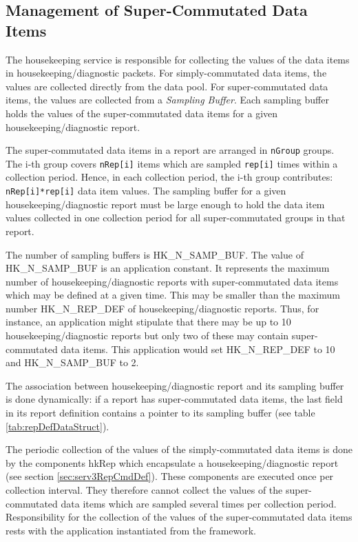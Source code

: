 \documentclass{pnp_article}
\begin{document}
\subsection{Management of Super-Commutated Data Items}\label{sec:serv3SupCommDataItems}
The housekeeping service is responsible for collecting the values of the data items in housekeeping/diagnostic packets. For simply-commutated data items, the values are collected directly from the data pool. For super-commutated data items, the values are collected from a \textit{Sampling Buffer}. Each sampling buffer holds the values of the super-commutated data items for a given housekeeping/diagnostic report.

The super-commutated data items in a report are arranged in \texttt{nGroup} groups. The i-th group covers \texttt{nRep[i]} items which are sampled \texttt{rep[i]} times within a collection period. Hence, in each collection period, the i-th group contributes: \texttt{nRep[i]*rep[i]} data item values. The sampling buffer for a given housekeeping/diagnostic report must be large enough to hold the data item values collected in one collection period for all super-commutated groups in that report.

The number of sampling buffers is HK\_N\_SAMP\_BUF. The value of HK\_N\_SAMP\_BUF is an application constant. It represents the maximum number of housekeeping/diagnostic reports with super-commutated data items which may be defined at a given time. This may be smaller than the maximum number HK\_N\_REP\_DEF of housekeeping/diagnostic reports. Thus, for instance, an application might stipulate that there may be up to 10 housekeeping/diagnostic reports but only two of these may contain super-commutated data items. This application would set HK\_N\_REP\_DEF to 10 and  HK\_N\_SAMP\_BUF to 2.

The association between housekeeping/diagnostic report and its sampling buffer is done dynamically: if a report has super-commutated data items, the last field in its report definition contains a pointer to its sampling buffer (see table \ref{tab:repDefDataStruct}).

The periodic collection of the values of the simply-commutated data items is done by the components hkRep which encapsulate a housekeeping/diagnostic report (see section \ref{sec:serv3RepCmdDef}). These components are executed once per collection interval. They therefore cannot collect the values of the super-commutated data items which are sampled several times per collection period. Responsibility for the collection of the values of the super-commutated data items rests with the application instantiated from the framework. 
\end{document}
